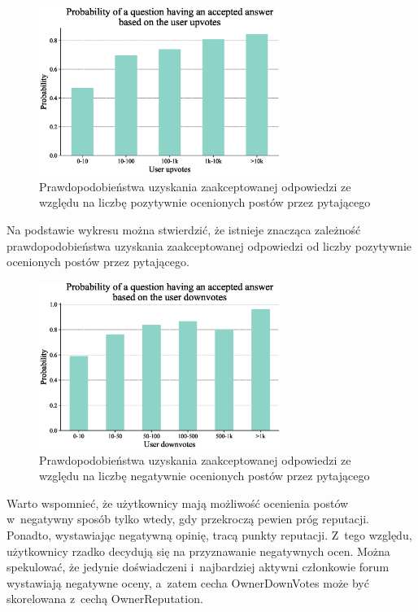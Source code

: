 \documentclass[12pt]{article}
\begin{document}
	\begin{figure}[H]
		\centering
		\includegraphics[width=0.7\textwidth]{user_upvotes}
		\caption{Prawdopodobieństwa uzyskania zaakceptowanej odpowiedzi ze względu na liczbę pozytywnie ocenionych postów przez pytającego}
		\label{fig:prawdopodobienstwa-uzyskania-odpowiedzi-upvotes}
	\end{figure}
	Na podstawie wykresu można stwierdzić, że istnieje znacząca zależność prawdopodobieństwa uzyskania zaakceptowanej odpowiedzi od liczby pozytywnie ocenionych postów przez pytającego.
	
	\begin{figure}[H]
		\centering
		\includegraphics[width=0.7\textwidth]{user_downvotes}
		\caption{Prawdopodobieństwa uzyskania zaakceptowanej odpowiedzi ze względu na liczbę negatywnie ocenionych postów przez pytającego}
		\label{fig:prawdopodobienstwa-uzyskania-odpowiedzi-downvotes}
	\end{figure}
	Warto wspomnieć, że użytkownicy mają możliwość ocenienia postów w~negatywny sposób tylko wtedy, gdy przekroczą pewien próg reputacji. Ponadto, wystawiając negatywną opinię, tracą punkty reputacji. Z~tego względu, użytkownicy rzadko decydują się na przyznawanie negatywnych ocen. Można spekulować, że jedynie doświadczeni i~najbardziej aktywni członkowie forum wystawiają negatywne oceny, a~zatem cecha OwnerDownVotes może być skorelowana z~cechą OwnerReputation.
	
\end{document}
